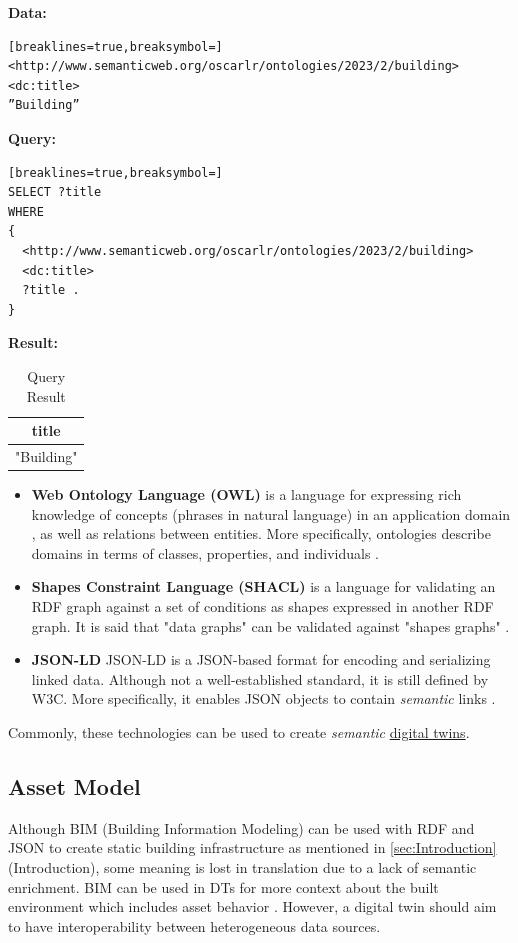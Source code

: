\documentclass{article}
\begin{document}
\textbf{Data:}
\begin{Verbatim}[breaklines=true,breaksymbol=]
<http://www.semanticweb.org/oscarlr/ontologies/2023/2/building> 
<dc:title> 
”Building”
\end{Verbatim}
\textbf{Query:}
\begin{Verbatim}[breaklines=true,breaksymbol=]
SELECT ?title 
WHERE
{
  <http://www.semanticweb.org/oscarlr/ontologies/2023/2/building> 
  <dc:title> 
  ?title . 
}
\end{Verbatim}
\textbf{Result:}
\begin{table}[H]
    \begin{tabular}{|c|}
        \hline
        \textbf{title} \\
        \hline
        "Building" \\
        \hline
    \end{tabular}
    \caption{Query Result}
    \label{tab:my_label}
\end{table}
    

\begin{itemize}
    \item \textbf{Web Ontology Language (OWL)} is a language for expressing rich knowledge of concepts (phrases in natural language) in an application domain \cite{szolovits_overview_1977}, as well as relations between entities. More specifically, ontologies describe domains in terms of classes, properties, and individuals \cite{bechhofer_owl_2009}.

    \item \textbf{Shapes Constraint Language (SHACL)} is a language for validating an RDF graph against a set of conditions as shapes expressed in another RDF graph. It is said that "data graphs" can be validated against "shapes graphs" \cite{noauthor_shapes_nodate}.
    
    \item \textbf{JSON-LD} JSON-LD is a JSON-based format for encoding and serializing linked data. Although not a well-established standard, it is still defined by W3C.  More specifically, it enables JSON objects to contain \emph{semantic} links \cite{noauthor_json-based_nodate}.
\end{itemize}

Commonly, these technologies can be used to create \emph{semantic} \hyperref[subsec:DigitalTwins]{digital twins}.

\subsection{Asset Model}\label{subsec:AssetModel}
Although BIM (Building Information Modeling) can be used with RDF and JSON to create static building infrastructure as mentioned in \ref{sec:Introduction}(Introduction), some meaning is lost in translation due to a lack of semantic enrichment. BIM can be used in DTs for more context about the built environment which includes asset behavior \cite{godager_concept_2021}. However, a digital twin should aim to have interoperability between heterogeneous data sources.
\end{document}
